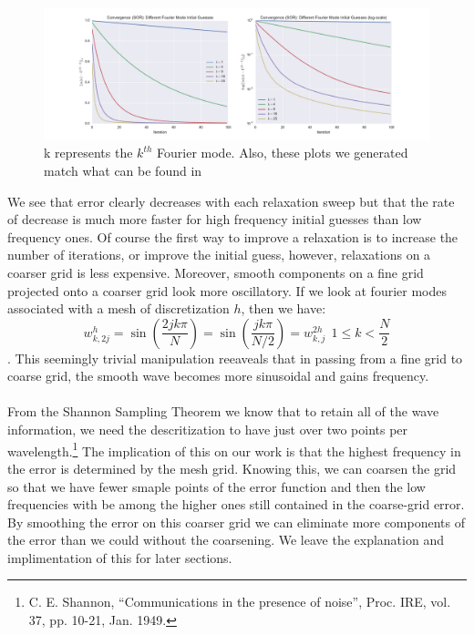\documentclass[pdftex,12pt,a4paper]{article}
\begin{document}
    \begin{figure}[h]
	\centering
	\includegraphics[scale=0.4]{../plots/convergence_sor_diff_modes-motivation.pdf}
    \caption{k represents the $k^{th}$ Fourier mode. Also, these plots we generated match what can be found in \cite{blue}}
	\end{figure}

    We see that error clearly decreases with each relaxation sweep but that the rate of decrease is much more faster for high frequency initial guesses than low frequency ones.  Of course the first way to improve a relaxation is to increase the number of iterations, or improve the initial guess, however, relaxations on a coarser grid is less expensive.  Moreover, smooth components on a fine grid projected onto a coarser grid look more oscillatory.  If we look at fourier modes associated with a mesh of discretization $h$, then we have:
    $$w_{k, 2j}^h = \sin \left( \frac{2jk \pi}{N}\right) =  \sin \left( \frac{jk \pi}{N/2}\right) = w_{k, j}^{2h} ~~ 1 \leq k < \frac N 2 $$.  This seemingly trivial manipulation reeaveals that in passing from a fine grid to coarse grid, the smooth wave becomes more sinusoidal and gains frequency.  

    \paragraph*{} From the Shannon Sampling Theorem we know that to retain all of the wave information, we need the descritization to have just over two points per wavelength.\footnote{C. E. Shannon, ``Communications in the presence of noise'', Proc. IRE, vol. 37, pp. 10-21, Jan. 1949.} The implication of this on our work is that the highest frequency in the error is determined by the mesh grid. Knowing this, we can coarsen the grid so that we have fewer smaple points of the error function and then the low frequencies with be among the higher ones still contained in the coarse-grid error. By smoothing the error on this coarser grid we can eliminate more components of the error than we could without the coarsening. We leave the explanation and implimentation of this for later sections.
\end{document}
